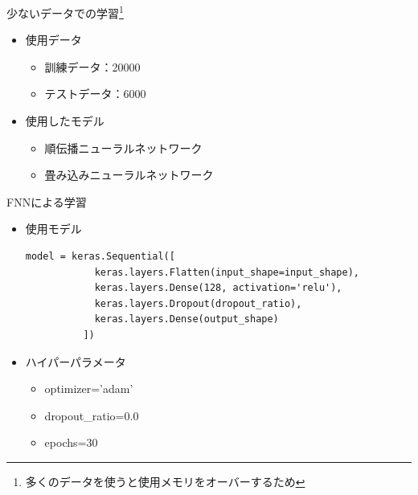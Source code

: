 \documentclass[uplatex, dvipdfmx]{beamer}
\begin{document}
  \begin{frame}{少ないデータでの学習\footnote{多くのデータを使うと使用メモリをオーバーするため}}
    \begin{itemize}
      \item 使用データ
      \begin{itemize}
        \item 訓練データ：20000
        \item テストデータ：6000
      \end{itemize}
      \item 使用したモデル
      \begin{itemize}
        \item 順伝播ニューラルネットワーク
        \item 畳み込みニューラルネットワーク
      \end{itemize}
    \end{itemize}
  \end{frame}

  \begin{frame}[fragile]{FNNによる学習}
    \begin{itemize}
      \item 使用モデル\mbox{}\\
        \begin{lstlisting}[caption=generate\_simple\_fnn.py]
          model = keras.Sequential([
            keras.layers.Flatten(input_shape=input_shape),
            keras.layers.Dense(128, activation='relu'),
            keras.layers.Dropout(dropout_ratio),
            keras.layers.Dense(output_shape)
          ])
        \end{lstlisting}
      \item ハイパーパラメータ\mbox{}\\
      \begin{itemize}
        \item optimizer='adam'
        \item dropout\_ratio=0.0
        \item epochs=30
      \end{itemize}
    \end{itemize}
  \end{frame}
\end{document}
